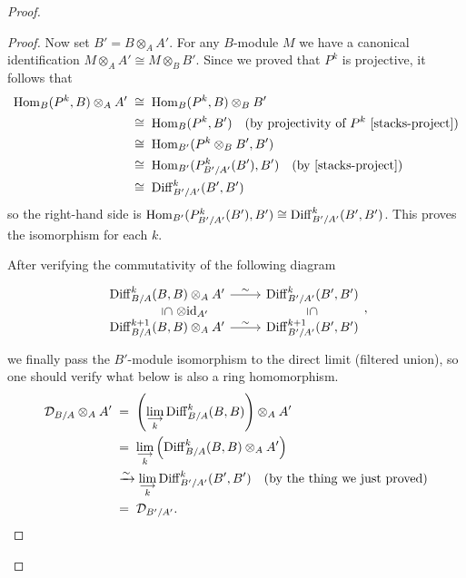 \begin{proof}
\begin{proof}
        Now set $B' = B\otimes_A A'$. For any $B$-module $M$ we have a canonical identification
        $M\otimes_A A' \cong M\otimes_B B'$. Since we proved that $P^k$ is projective, it follows that
        \begin{align*}
            \Hom_B(P^k,B)\otimes_A A' \;
             & \cong\; \Hom_B(P^k,B)\otimes_B B'                                                                                                                \\
             & \cong\; \Hom_B(P^k,B') \quad \text{(by projectivity of $P^k$ \cite[\href{https://stacks.math.columbia.edu/tag/0DVB}{Tag 0DVB}]{stacks-project})} \\
             & \cong\; \Hom_{B'}(P^k\otimes_B B',B')                                                                                                            \\
             & \cong\; \Hom_{B'}(P^k_{B'/A'}(B'),B') \quad \text{(by \cite[\href{https://stacks.math.columbia.edu/tag/08HZ}{Tag 08HZ}]{stacks-project})}        \\
             & \cong\; \Diff^k_{B'/A'}(B',B')
        \end{align*}
        so the right-hand side is $\operatorname{Hom}_{B'}(P^k_{B'/A'}(B'),B')\cong \operatorname{Diff}^k_{B'/A'}(B',B')$.
        This proves the isomorphism for each $k$.

        After verifying the commutativity of the following diagram
        \begin{equation*}
            \begin{tikzcd}[row sep=0.5em]
                \Diff^k_{B/A}(B,B) \otimes_A A' \arrow[r, "\sim"] \arrow[d, phantom, "{\rotatebox[origin=c]{-90}{$\subseteq$}}", "\otimes \mathrm{id}_{A'}"{anchor=center, xshift=2em}] & \Diff^k_{B'/A'}(B',B') \arrow[d, phantom, "{\rotatebox[origin=c]{-90}{$\subseteq$}}"] \\
                \Diff^{k+1}_{B/A}(B,B) \otimes_A A' \arrow[r, "\sim"] & \Diff^{k+1}_{B'/A'}(B',B')
            \end{tikzcd},
        \end{equation*}
        we finally pass the $B'$-module isomorphism to the direct limit (filtered union), so one should verify what below is also a ring homomorphism.
        \begin{align*}
            \mathcal{D}_{B/A} \otimes_A A' \;
             & =\; \left(\lim\limits_{\substack{\longrightarrow          \\ k}} \operatorname{Diff}^k_{B/A}(B,B)\right)\otimes_A A' \\
             & =\; \lim\limits_{\substack{\longrightarrow                \\ k}}\left(\operatorname{Diff}^k_{B/A}(B,B)\otimes_A A'\right) \\
             & \xrightarrow{\sim} \lim\limits_{\substack{\longrightarrow \\ k}}\operatorname{Diff}^k_{B'/A'}(B',B') \quad \text{(by the thing we just proved)}\\
             & =\; \mathcal{D}_{B'/A'}.
        \end{align*}
    \end{proof}


\end{proof}
